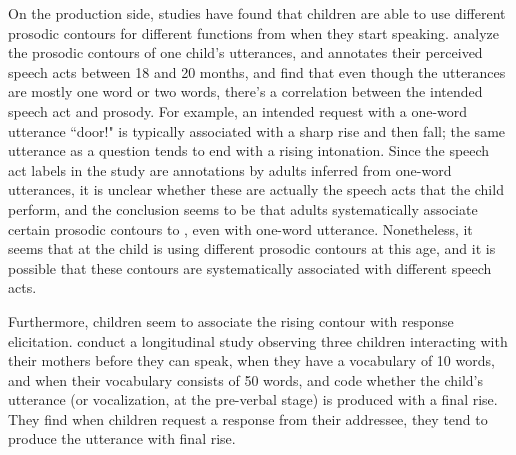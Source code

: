 
On the production side, studies have found that children are able to use different prosodic contours for different functions from when they start speaking. \textcite{menyuk1969prosody} analyze the prosodic contours of one child's utterances, and annotates their perceived speech acts between 18  and 20 months, and find that even though the utterances are mostly one word or two words, there's a correlation between the intended speech act and prosody. For example, an intended request with a one-word utterance ``door!" is typically associated with a sharp rise and then fall; the same utterance as a question tends to end with a rising intonation. Since the speech act labels in the study are annotations by adults inferred from one-word utterances, it is unclear whether these are actually the speech acts that the child perform, and the conclusion seems to be that adults systematically associate certain prosodic contours to \aqrs{}, even with one-word utterance. Nonetheless, it seems that at the child is using different prosodic contours at this age, and it is possible that these contours are systematically associated with different speech acts. 


Furthermore, children seem to associate the rising contour with response elicitation. \textcite{flax1991prosody} conduct a longitudinal study observing three children interacting with their mothers before they can speak, when they have a vocabulary of 10 words, and when their vocabulary consists of 50 words, and code whether the child's utterance (or vocalization, at the pre-verbal stage) is produced with a final rise. They find when children request a response from their addressee, they tend to produce the utterance with final rise. 

